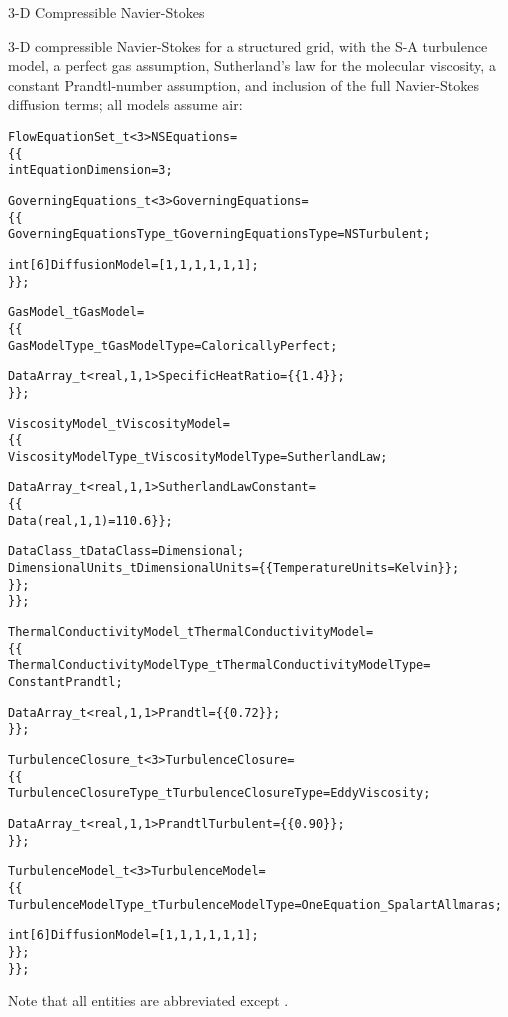 \begin{example}{3-D Compressible Navier-Stokes}
\label{e:eqn_NS}

3-D compressible Navier-Stokes for a structured grid, with the S-A
turbulence model, a perfect gas assumption, Sutherland's law for the
molecular viscosity, a constant Prandtl-number assumption, and
inclusion of the full Navier-Stokes diffusion terms; all models assume
air:
\begin{alltt}
  FlowEquationSet\_t<3> NSEquations = 
    \{\{
    int EquationDimension = 3 ;
    
    GoverningEquations\_t<3> GoverningEquations =
      \{\{
      GoverningEquationsType\_t GoverningEquationsType = NSTurbulent ;
      
      int[6] DiffusionModel = [1,1,1,1,1,1] ;
      \}\} ;
      
    GasModel\_t GasModel =
      \{\{
      GasModelType\_t GasModelType = CaloricallyPerfect ;
      
      DataArray\_t<real, 1, 1> SpecificHeatRatio = \{\{ 1.4 \}\} ;
      \}\} ;

    ViscosityModel\_t ViscosityModel =
      \{\{
      ViscosityModelType\_t ViscosityModelType = SutherlandLaw ;
      
      DataArray\_t<real, 1, 1> SutherlandLawConstant = 
        \{\{ 
        Data(real, 1, 1) = 110.6 \}\} ;
      
        DataClass\_t DataClass = Dimensional ;
        DimensionalUnits\_t DimensionalUnits = \{\{ TemperatureUnits = Kelvin \}\} ;
        \}\} ;
      \}\} ;

    ThermalConductivityModel\_t ThermalConductivityModel =
      \{\{
      ThermalConductivityModelType\_t ThermalConductivityModelType =
         ConstantPrandtl ;
      
      DataArray\_t<real, 1, 1> Prandtl = \{\{ 0.72 \}\} ;
      \}\} ;

    TurbulenceClosure\_t<3> TurbulenceClosure =
      \{\{
      TurbulenceClosureType\_t TurbulenceClosureType = EddyViscosity ;
      
      DataArray\_t<real, 1, 1> PrandtlTurbulent = \{\{ 0.90 \}\} ;
      \}\} ;
      
    TurbulenceModel\_t<3> TurbulenceModel =
      \{\{
      TurbulenceModelType\_t TurbulenceModelType = OneEquation\_SpalartAllmaras ;
      
      int[6] DiffusionModel = [1,1,1,1,1,1] ;
      \}\} ;      
    \}\} ;
\end{alltt}
Note that all  entities are abbreviated except
.
\end{example}
